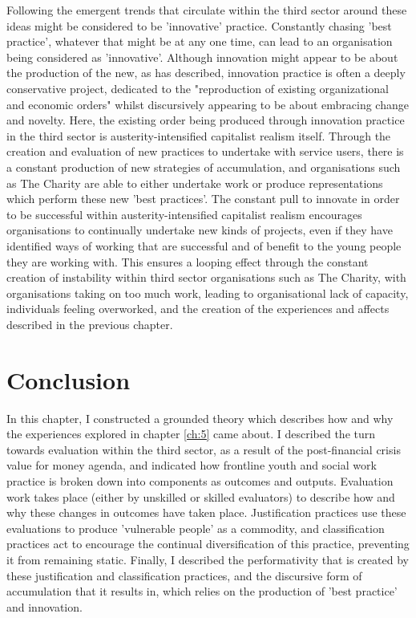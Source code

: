 Following the emergent trends that circulate within the third sector around these ideas might be considered to be 'innovative' practice. Constantly chasing 'best practice', whatever that might be at any one time, can lead to an organisation being considered as 'innovative'. Although innovation might appear to be about the production of the new, as \citet[331]{suchman_problematizing_2000} has described, innovation practice is often a deeply conservative project, dedicated to the "reproduction of existing organizational and economic orders" whilst discursively appearing to be about embracing change and novelty. Here, the existing order being produced through innovation practice in the third sector is austerity-intensified capitalist realism itself. Through the creation and evaluation of new practices to undertake with service users, there is a constant production of new strategies of accumulation, and organisations such as The Charity are able to either undertake work or produce representations which perform these new 'best practices'. The constant pull to innovate in order to be successful within austerity-intensified capitalist realism encourages organisations to continually undertake new kinds of projects, even if they have identified ways of working that are successful and of benefit to the young people they are working with. This ensures a looping effect through the constant creation of instability within third sector organisations such as The Charity, with organisations taking on too much work, leading to organisational lack of capacity, individuals feeling overworked, and the creation of the experiences and affects described in the previous chapter. 

\section{Conclusion}
\label{sec:6-8-conclusion}
In this chapter, I constructed a grounded theory which describes how and why the experiences explored in chapter \ref{ch:5} came about. I described the turn towards evaluation within the third sector, as a result of the post-financial crisis value for money agenda, and indicated how frontline youth and social work practice is broken down into components as outcomes and outputs. Evaluation work takes place (either by unskilled or skilled evaluators) to describe how and why these changes in outcomes have taken place. Justification practices use these evaluations to produce 'vulnerable people' as a commodity, and classification practices act to encourage the continual diversification of this practice, preventing it from remaining static. Finally, I described the performativity that is created by these justification and classification practices, and the discursive form of accumulation that it results in, which relies on the production of 'best practice' and innovation.

